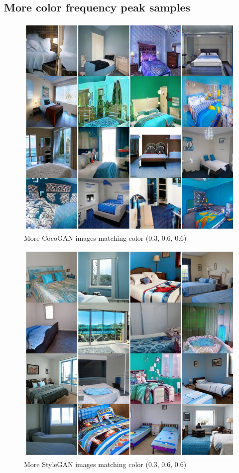 \documentclass{article}
\begin{document}
    \subsection{More color frequency peak samples}
    \begin{figure}[H]
          \centering
          \includegraphics[scale=0.4]{color-images/coco_more_peak_images.png}
          \caption{More CocoGAN images matching color (0.3, 0.6, 0.6)}
    \end{figure}
       \begin{figure}[H]
          \centering
          \includegraphics[scale=0.4]{color-images/style_more_peak_images.png}
          \caption{More StyleGAN images matching color (0.3, 0.6, 0.6)}
    \end{figure}
    \newpage
\end{document}
